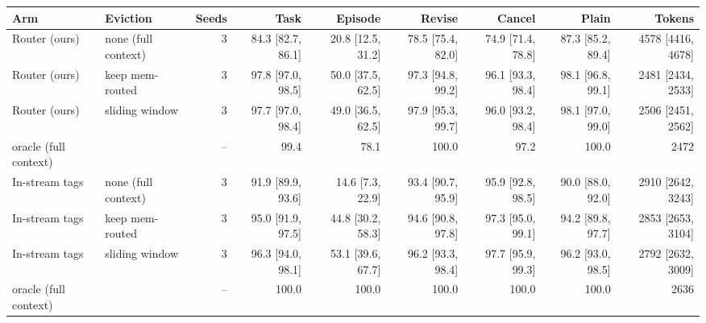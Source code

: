 \begin{tabular}{llrrrrrrr}
\toprule
Arm & Eviction & Seeds & Task & Episode & Revise & Cancel & Plain & Tokens \\
\midrule
Router (ours) & none (full context) & 3 & 84.3 {\scriptsize[82.7, 86.1]} & 20.8 {\scriptsize[12.5, 31.2]} & 78.5 {\scriptsize[75.4, 82.0]} & 74.9 {\scriptsize[71.4, 78.8]} & 87.3 {\scriptsize[85.2, 89.4]} & 4578 {\scriptsize[4416, 4678]} \\
Router (ours) & keep mem-routed & 3 & 97.8 {\scriptsize[97.0, 98.5]} & 50.0 {\scriptsize[37.5, 62.5]} & 97.3 {\scriptsize[94.8, 99.2]} & 96.1 {\scriptsize[93.3, 98.4]} & 98.1 {\scriptsize[96.8, 99.1]} & 2481 {\scriptsize[2434, 2533]} \\
Router (ours) & sliding window & 3 & 97.7 {\scriptsize[97.0, 98.4]} & 49.0 {\scriptsize[36.5, 62.5]} & 97.9 {\scriptsize[95.3, 99.7]} & 96.0 {\scriptsize[93.2, 98.4]} & 98.1 {\scriptsize[97.0, 99.0]} & 2506 {\scriptsize[2451, 2562]} \\
\quad oracle (full context) & & -- & {\color{gray}99.4} & {\color{gray}78.1} & {\color{gray}100.0} & {\color{gray}97.2} & {\color{gray}100.0} & {\color{gray}2472} \\
In-stream tags & none (full context) & 3 & 91.9 {\scriptsize[89.9, 93.6]} & 14.6 {\scriptsize[7.3, 22.9]} & 93.4 {\scriptsize[90.7, 95.9]} & 95.9 {\scriptsize[92.8, 98.5]} & 90.0 {\scriptsize[88.0, 92.0]} & 2910 {\scriptsize[2642, 3243]} \\
In-stream tags & keep mem-routed & 3 & 95.0 {\scriptsize[91.9, 97.5]} & 44.8 {\scriptsize[30.2, 58.3]} & 94.6 {\scriptsize[90.8, 97.8]} & 97.3 {\scriptsize[95.0, 99.1]} & 94.2 {\scriptsize[89.8, 97.7]} & 2853 {\scriptsize[2653, 3104]} \\
In-stream tags & sliding window & 3 & 96.3 {\scriptsize[94.0, 98.1]} & 53.1 {\scriptsize[39.6, 67.7]} & 96.2 {\scriptsize[93.3, 98.4]} & 97.7 {\scriptsize[95.9, 99.3]} & 96.2 {\scriptsize[93.0, 98.5]} & 2792 {\scriptsize[2632, 3009]} \\
\quad oracle (full context) & & -- & {\color{gray}100.0} & {\color{gray}100.0} & {\color{gray}100.0} & {\color{gray}100.0} & {\color{gray}100.0} & {\color{gray}2636} \\
\bottomrule
\end{tabular}

